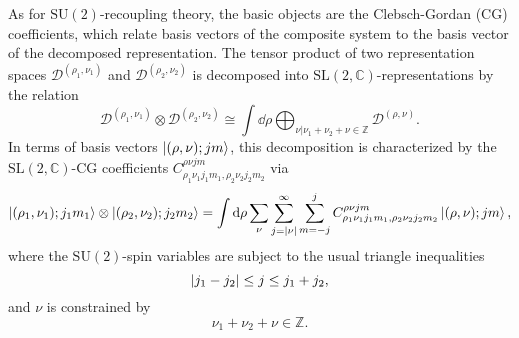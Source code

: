 \documentclass[11pt,a4paper]{article}
\newcommand{\C}{\mathbb C}
\newcommand{\SU}{\text{SU$(2)$}}
\newcommand{\SL}{\text{SL$(2,\C)$}}
\begin{document}
As for $\SU$-recoupling theory, the basic objects are the Clebsch-Gordan (CG) coefficients, which relate basis vectors of the composite system to the basis vector of the decomposed representation. The tensor product of two representation spaces $\mathcal{D}^{(\rho_1,\nu_1)}$ and $\mathcal{D}^{(\rho_2,\nu_2)}$ is decomposed into $\SL$-representations by the relation
%
\begin{equation}
\mathcal{D}^{(\rho_1,\nu_1)}\otimes\mathcal{D}^{(\rho_2,\nu_2)}
\cong
\int\dd{\rho}\bigoplus_{\nu\vert \nu_1+\nu_2+\nu\in\mathbb{Z}}\mathcal{D}^{(\rho,\nu)}.
\end{equation} 
%
In terms of basis vectors $\ket{(\rho,\nu);jm}$, this decomposition is characterized by the $\SL$-CG coefficients $C^{\rho\nu jm}_{\rho_1\nu_1 j_1 m_1, \rho_2\nu_2 j_2 m_2}$ via
%
\begin{equation}
\ket{(\rho_1,\nu_1);j_1 m_1}\otimes\ket{(\rho_2,\nu_2); j_2 m_2}
=
\int\dd{\rho}\sum_{\nu}\sum_{j = \abs{\nu}}^{\infty}\sum_{m = -j}^{j} C^{\rho\nu jm}_{\rho_1\nu_1 j_1 m_1, \rho_2\nu_2 j_2 m_2} \ket{(\rho,\nu);jm},
\end{equation}
%
where the $\SU$-spin variables are subject to the usual triangle inequalities
%
\begin{equation}
\abs{j_1 - j_2}\leq j \leq j_1 + j_2,
\end{equation}
%
and $\nu$ is constrained by
%
\begin{equation}
\nu_1 + \nu_2 + \nu \in\mathbb{Z}.
\end{equation}
\end{document}
